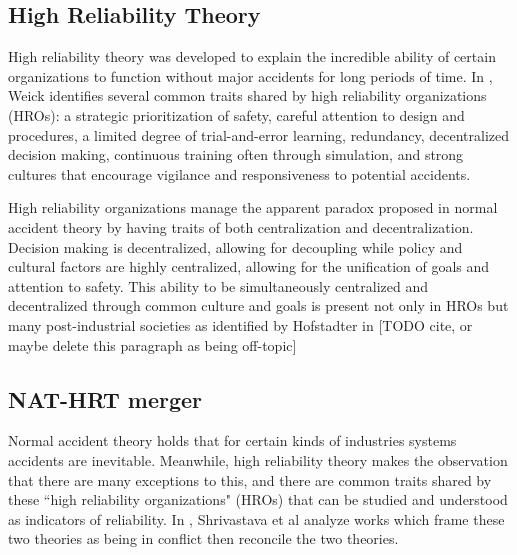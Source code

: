 \documentclass[11pt]{article}
\begin{document}
\subsection{High Reliability Theory}


High reliability theory was developed to explain the incredible ability of certain organizations to
function without major accidents for long periods of time. In \cite{weick1999reliability}, Weick
identifies several common traits shared by high reliability organizations (HROs): a strategic
prioritization of safety, careful attention to design and procedures, a limited degree of
trial-and-error learning, redundancy, decentralized decision making, continuous training often
through simulation, and strong cultures that encourage vigilance and responsiveness to potential
accidents.  

High reliability organizations manage the apparent paradox proposed in normal accident theory by
having traits of both centralization and decentralization. Decision making is decentralized,
allowing for decoupling while policy and cultural factors are highly centralized, allowing for the
unification of goals and attention to safety. This ability to be simultaneously centralized and
decentralized through common culture and goals is present not only in HROs but many post-industrial
societies as identified by Hofstadter in [TODO cite, or maybe delete this paragraph as being
off-topic]

\subsection{NAT-HRT merger}

Normal accident theory holds that for certain kinds of industries systems accidents are inevitable.
Meanwhile, high reliability theory makes the observation that there are many exceptions to this, and
there are common traits shared by these ``high reliability organizations" (HROs) that can be studied
and understood as indicators of reliability. In \cite{shrivastave2009normal}, Shrivastava et al
analyze works which frame these two theories as being in conflict then reconcile the two theories.
\end{document}
